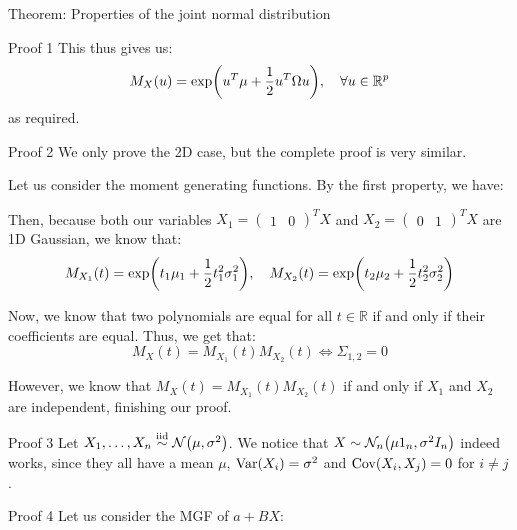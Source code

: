 \documentclass[a4paper]{article}
\begin{document}
\begin{parag}{Theorem: Properties of the joint normal distribution}
\begin{subparag}{Proof 1}
        This thus gives us: 
        \[M_X\left(u\right) = \exp\left(u^T \mu + \frac{1}{2} u^T \Omega u\right), \mathspace \forall u \in \mathbb{R}^p\]
        as required.
    \end{subparag}

    \begin{subparag}{Proof 2}
        We only prove the 2D case, but the complete proof is very similar.

        Let us consider the moment generating functions. By the first property, we have:

        Then, because both our variables $X_1 = \begin{pmatrix} 1 & 0 \end{pmatrix}^T X$ and $X_2 = \begin{pmatrix} 0 & 1 \end{pmatrix}^T X $ are 1D Gaussian, we know that: 
        \[M_{X_1}\left(t\right) = \exp\left(t_1 \mu_1 + \frac{1}{2}t_1^2 \sigma_1^2\right), \mathspace M_{X_2}\left(t\right) = \exp\left(t_2 \mu_2 + \frac{1}{2}t_2^2 \sigma_2^2\right)\]
        
        Now, we know that two polynomials are equal for all $t \in \mathbb{R}$ if and only if their coefficients are equal. Thus, we get that: 
        \[M_{X}\left(t\right) = M_{X_1}\left(t\right) M_{X_2}\left(t\right) \iff \Sigma_{1,2} = 0\]
        
        However, we know that $M_{X}\left(t\right) = M_{X_1}\left(t\right) M_{X_2}\left(t\right)$ if and only if $X_1$ and $X_2$ are independent, finishing our proof.
    \end{subparag}
    
    \begin{subparag}{Proof 3}
        Let $X_1, \ldots, X_n \iid \mathcal{N}\left(\mu, \sigma^2\right)$. We notice that $X \followsdistr \mathcal{N}_n\left(\mu 1_n, \sigma^2 I_n\right)$ indeed works, since they all have a mean $\mu$, $\Var\left(X_i\right) = \sigma^2$ and $\Cov\left(X_i, X_j\right) = 0$ for $i \neq j$.
    \end{subparag}

    \begin{subparag}{Proof 4}
        Let us consider the MGF of $a + BX$: 


\end{subparag}
\end{parag}
\end{document}
